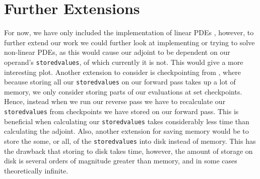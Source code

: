 \documentclass{article}
\begin{document}
\newpage

\section{Further Extensions}

For now, we have only included the implementation of linear PDEs \cite{github}, however, to further extend our work we could further look at implementing or trying to solve non-linear PDEs, as this would cause our adjoint to be dependent on our operand's \verb|storedvalues|, of which currently it is not. This would give a more interesting plot. Another extension to consider is checkpointing from \cite{checkpoint}, where because storing all our \verb|storedvalues| on our forward pass takes up a lot of memory, we only consider storing parts of our evaluations at set checkpoints. Hence, instead when we run our reverse pass we have to recalculate our \verb|storedvalues| from checkpoints we have stored on our forward pass. This is beneficial when calculating our \verb|storedvalues| takes considerably less time than calculating the adjoint. Also, another extension for saving memory would be to store the some, or all, of the \verb|storedvalues| into disk instead of memory. This has the drawback that storing to disk takes time, however, the amount of storage on disk is several orders of magnitude greater than memory, and in some cases theoretically infinite.


\end{document}
